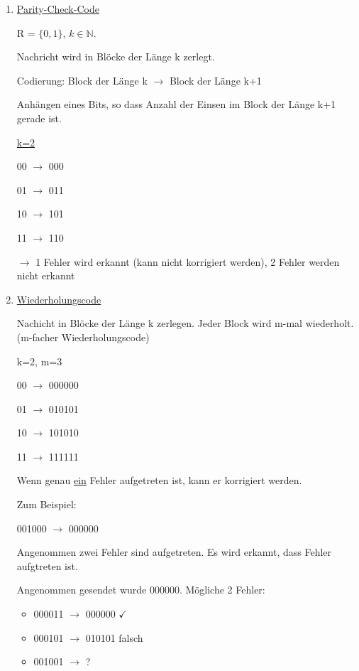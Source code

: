   \begin{enumerate}[label=(\alph*)]
    \item \underline{Parity-Check-Code}

    R = $\{0,1\}$, $k \in \mathbb{N}$.

    Nachricht wird in Blöcke der Länge k zerlegt. 

    Codierung: Block der Länge k  $\rightarrow$ Block der Länge k+1

    Anhängen eines Bits, so dass Anzahl der Einsen im Block der Länge k+1 gerade ist.

    \par \medskip

    \underline{k=2}

    00 $\rightarrow$ 000

    01 $\rightarrow$ 011

    10 $\rightarrow$ 101

    11 $\rightarrow$ 110

    $\rightarrow$ 1 Fehler wird erkannt (kann nicht korrigiert werden), 2 Fehler werden nicht erkannt

    \item \underline{Wiederholungscode}

    Nachicht in Blöcke der Länge k zerlegen. Jeder Block wird m-mal wiederholt. (m-facher Wiederholungscode)

    k=2, m=3

    00 $\rightarrow$ 000000

    01 $\rightarrow$ 010101
    
    10 $\rightarrow$ 101010

    11 $\rightarrow$ 111111

    \par \medskip

    \par \medskip

    Wenn genau \underline{ein} Fehler aufgetreten ist, kann er korrigiert werden.

    Zum Beispiel:

    001000 $\rightarrow$ 000000

    Angenommen zwei Fehler sind aufgetreten. Es wird erkannt, dass Fehler aufgtreten ist.

    \par \medskip

    Angenommen gesendet wurde 000000. Mögliche 2 Fehler:

    \begin{itemize}
      \item 000011 $\rightarrow$ 000000 $\checkmark$
      \item 000101 $\rightarrow$ 010101 falsch
      \item 001001 $\rightarrow$ ?
    \end{itemize}


\end{enumerate}
